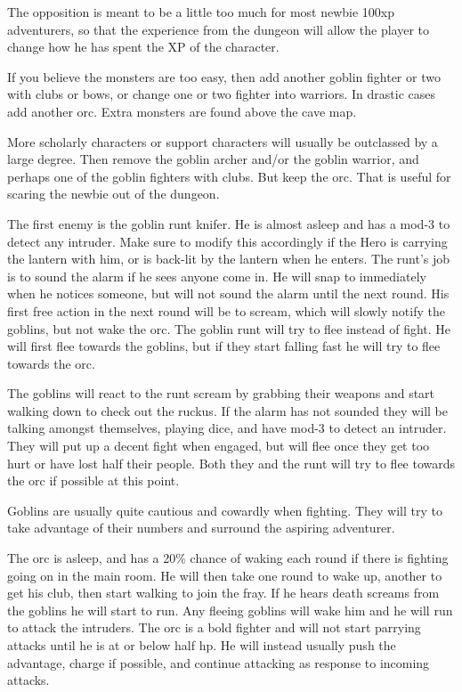 The opposition is meant to be a little too much for most newbie 100xp adventurers, so that the experience from the dungeon will allow the player to change how he has spent the XP of the character.

If you believe the monsters are too easy, then add another goblin fighter or two with clubs or bows, or change one or two fighter into warriors. In drastic cases add another orc. Extra monsters are found above the cave map.

More scholarly characters or support characters will usually be outclassed by a large degree. Then remove the goblin archer and/or the goblin warrior, and perhaps one of the goblin fighters with clubs. But keep the orc. That is useful for scaring the newbie out of the dungeon.

The first enemy is the goblin runt knifer. He is almost asleep and has a mod-3 to detect any intruder. Make sure to modify this accordingly if the Hero is carrying the lantern with him, or is back-lit by the lantern when he enters. The runt's job is to sound the alarm if he sees anyone come in. He will snap to immediately when he notices someone, but will not sound the alarm until the next round. His first free action in the next round will be to scream, which will slowly notify the goblins, but not wake the orc.
The goblin runt will try to flee instead of fight. He will first flee towards the goblins, but if they start falling fast he will try to flee towards the orc.


The goblins will react to the runt scream by grabbing their weapons and start walking down to check out the ruckus. If the alarm has not sounded they will be talking amongst themselves, playing dice, and have mod-3 to detect an intruder. They will put up a decent fight when engaged, but will flee once they get too hurt or have lost half their people. Both they and the runt will try to flee towards the orc if possible at this point.

Goblins are usually quite cautious and cowardly when fighting. They will try to take advantage of their numbers and surround the aspiring adventurer.


The orc is asleep, and has a 20\% chance of waking each round if there is fighting going on in the main room. He will then take one round to wake up, another to get his club, then start walking to join the fray. If he hears death screams from the goblins he will start to run. Any fleeing goblins will wake him and he will run to attack the intruders. The orc is a bold fighter and will not start parrying attacks until he is at or below half hp. He will instead usually push the advantage, charge if possible, and continue attacking as response to incoming attacks.

